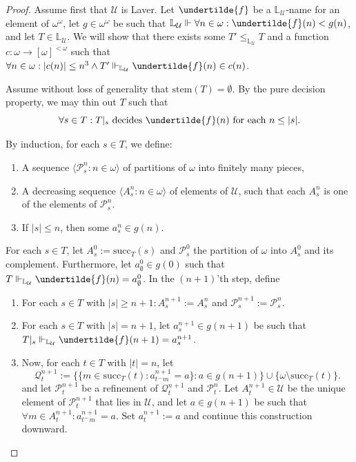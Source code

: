 \documentclass[12pt]{article}
\theoremstyle{definition}
\begin{document}
\begin{proof}
	Assume first that $\mathcal{U}$ is Laver. Let $\undertilde{f}$ be a $\mathbb{L}_{\mathcal{U}}$-name for an element of $\omega^{\omega}$, let $g \in \omega^{\omega}$ be such that $\mathbb{L}_{\mathcal{U}}\Vdash \forall n \in \omega: \undertilde{f}(n)< g(n)$, and let $T \in \mathbb{L}_{\mathcal{U}}$. We will show that there exists some $T' \leq_{\mathbb{L}_{\mathcal{U}}}T$ and a function $c: \omega \to [\omega]^{<\omega}$ such that $\forall n \in \omega: |c(n)|\leq n^{3} \land T' \Vdash_{\mathbb{L}_{\mathcal{U}}}\undertilde{f}(n)\in c(n)$.

Assume without loss of generality that $\text{stem}(T)=\emptyset$. By the pure decision property, we may thin out $T$ such that
\[\forall s \in T: T|_s \text{ decides } \undertilde{f}(n) \text{ for each } n \leq |s|.\]

By induction, for each $s\in T$, we define:

\begin{enumerate}[label=(\roman*)]
\item A sequence $\langle \mathcal{P}_s^{n}: n \in \omega\rangle$ of partitions of $\omega$ into finitely many pieces,
\item A decreasing sequence $\langle A_s^{n}: n \in \omega\rangle$ of elements of $\mathcal{U}$, such that each $A_s^n$ is one of the elements of $\mathcal{P}_s^n$.
\item If $|s| \leq n$, then some $a_s^n \in g(n)$.
\end{enumerate}

For each $s \in T$, let $A_s^0:=\text{succ}_{T}(s)$ and $\mathcal{P}_s^0$ the partition of $\omega$ into $A_s^0$ and its complement. Furthermore, let $a_{\emptyset}^0 \in g(0)$ such that $T \Vdash_{\mathbb{L}_{\mathcal{U}}}\undertilde{f}(n)=a_{\emptyset}^0$. In the $(n+1)$'th step, define

\begin{enumerate}[label=(\roman*)]
\item For each $s\in T$ with $|s|\geq n+1: A_s^{n+1}:=A_s^{n}$ and $\mathcal{P}_s^{n+1}:=\mathcal{P}_s^{n}$.
\item For each $s \in T$ with $|s|=n+1$, let $a_s^{n+1}\in g(n+1)$ be such that $T|_s \Vdash_{\mathbb{L}_{\mathcal{U}}}\undertilde{f}(n+1)=a_s^{n+1}$.
\item Now, for each $t \in T$ with $|t|=n$, let
\[\mathcal{Q}_t^{n+1}:=\{\{m \in \text{succ}_T(t): a_{t^{\smallfrown}m}^{n+1}=a\}: a \in g(n+1)\} \cup \{\omega \setminus \text{succ}_T(t)\}.\]
and let $\mathcal{P}_t^{n+1}$ be a refinement of $\mathcal{Q}_t^{n+1}$ and $\mathcal{P}_t^{n}$. Let $A_t^{n+1}\in \mathcal{U}$ be the unique element of $\mathcal{P}_t^{n+1} $ that lies in $\mathcal{U}$, and let $a \in g(n+1)$ be such that $\forall m \in A_t^{n+1}: a_{t^{\smallfrown}m}^{n+1}=a$. Set $a_t^{n+1}:=a$ and continue this construction downward.
\end{enumerate}


\end{proof}
\end{document}
